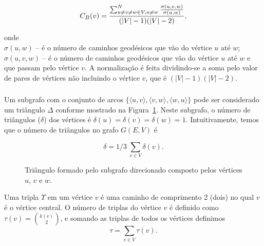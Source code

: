 \documentclass[a4paper,12pt,twoside]{article}
\def\tupla#1{\langle#1\rangle}
\begin{document}
\begin{displaymath}
  C_B(v) = { { \sum_{ u \ne v \ne w \in V, u \ne w}^N
      \frac{\sigma(u, v, w)}{\sigma(u,w)} } \over {(|V|-1)(|V|-2)}},
\end{displaymath}


\noindent onde\\
$\sigma(u, w)$ -- é o número de caminhos geodésicos que vão do vértice
$u$ até $w$;\\
$\sigma(u,v,w)$ -- é o número de caminhos geodésicos que vão do vértice
$u$ até $w$ e que passam pelo vértice $v$.
A normalização é feita dividindo-se a soma pelo valor de pares de
vértices não incluindo o vértice $v$, que é $(|V|-1)(|V|-2)$.


\subsubsection{\group}
\label{s:agrupamento}

Um subgrafo com o conjunto de arcos
$\{\tupla{u,v},\tupla{v,w},\tupla{w,u}\}$ pode ser considerado um triângulo
$\Delta$ conforme mostrado na Figura~\ref{fig:delta}. Neste subgrafo,
o número de triângulos ($\delta$) dos vértices é
$\delta(u)=\delta(v)=\delta(w)=1$. Intuitivamente, temos que o número de
triângulos no grafo $G(E,V)$ é

\begin{equation}
  \label{eq:delta}
  \delta = 1/3\ \sum_{v \in V} \delta(v).
\end{equation}

\begin{figure}[ht]
\centering


\caption{Triângulo formado pelo subgrafo direcionado composto pelos
  vértices $u$, $v$ e $w$.}

\label{fig:delta}
\end{figure}

Uma tripla $\Upsilon$ em um vértice $v$ é uma caminho de comprimento
2 (dois) no qual $v$ é o vértice central. O número de triplas do
vértice $v$ é definido como $\tau(v)={k(v)\choose 2}$, e somando as
triplas de todos os vértices definimos
\begin{displaymath}
  \label{eq:triple}
  \tau=\sum_{v \in V}\tau(v).
\end{displaymath}
\end{document}
